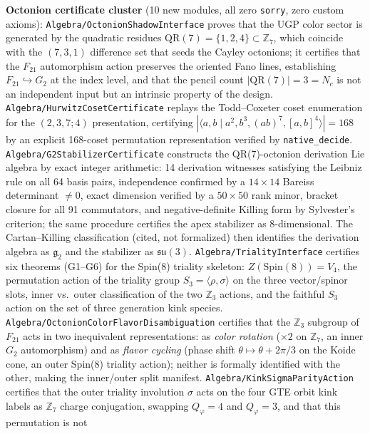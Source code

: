 \documentclass[11pt,a4paper]{article}
\theoremstyle{definition}
\begin{document}
\medskip
\noindent\textbf{Octonion certificate cluster}
(10 new modules, all zero \texttt{sorry}, zero custom axioms):
\texttt{Algebra/OctonionShadowInterface} proves that the UGP color sector is
generated by the quadratic residues $\mathrm{QR}(7) = \{1,2,4\} \subset \mathbb{Z}_7$,
which coincide with the $(7,3,1)$ difference set that seeds the Cayley octonions;
it certifies that the $F_{21}$ automorphism action preserves the oriented Fano lines,
establishing $F_{21} \hookrightarrow G_2$ at the index level, and that the pencil
count $|\mathrm{QR}(7)| = 3 = N_c$ is not an independent input but an intrinsic
property of the design.
\texttt{Algebra/HurwitzCosetCertificate} replays the Todd--Coxeter coset
enumeration for the $(2,3,7;4)$ presentation, certifying $|\langle a,b \mid
a^2, b^3, (ab)^7, [a,b]^4\rangle| = 168$ by an explicit 168-coset permutation
representation verified by \texttt{native\_decide}.
\texttt{Algebra/G2StabilizerCertificate} constructs the QR(7)-octonion derivation
Lie algebra by exact integer arithmetic: 14 derivation witnesses satisfying the
Leibniz rule on all 64 basis pairs, independence confirmed by a
$14 \times 14$ Bareiss determinant $\neq 0$, exact dimension verified by a
$50 \times 50$ rank minor, bracket closure for all 91 commutators, and
negative-definite Killing form by Sylvester's criterion; the same procedure
certifies the apex stabilizer as 8-dimensional.
The Cartan--Killing classification (cited, not formalized) then identifies the
derivation algebra as $\mathfrak{g}_2$ and the stabilizer as $\mathfrak{su}(3)$.
\texttt{Algebra/TrialityInterface} certifies six theorems (G1--G6) for the
Spin(8) triality skeleton: $Z(\mathrm{Spin}(8)) = V_4$, the permutation action of
the triality group $S_3 = \langle\rho,\sigma\rangle$ on the three vector/spinor
slots, inner vs.\ outer classification of the two $\mathbb{Z}_3$ actions, and the
faithful $S_3$ action on the set of three generation kink species.
\texttt{Algebra/OctonionColorFlavorDisambiguation} certifies that the $\mathbb{Z}_3$
subgroup of $F_{21}$ acts in two inequivalent representations: as \emph{color
rotation} ($\times 2$ on $\mathbb{Z}_7$, an inner $G_2$ automorphism) and as
\emph{flavor cycling} (phase shift $\theta \mapsto \theta + 2\pi/3$ on the Koide
cone, an outer Spin(8) triality action); neither is formally identified with the
other, making the inner/outer split manifest.
\texttt{Algebra/KinkSigmaParityAction} certifies that the outer triality involution
$\sigma$ acts on the four GTE orbit kink labels as $\mathbb{Z}_7$ charge conjugation,
swapping $Q_\varphi = 4$ and $Q_\varphi = 3$, and that this permutation is not
\end{document}
